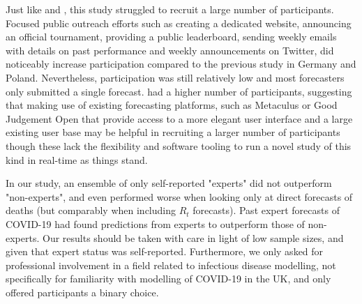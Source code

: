 \documentclass[10pt,a4paper,twocolumn]{article}
\begin{document}

Just like \citet{bosseComparingHumanModelbased2022} and \citet{farrowHumanJudgmentApproach2017}, this study struggled to recruit a large number of participants. Focused public outreach efforts such as creating a dedicated website, announcing an official tournament, providing a public leaderboard, sending weekly emails with details on past performance and weekly announcements on Twitter, did noticeably increase participation compared to the previous study in Germany and Poland. Nevertheless, participation was still relatively low and most forecasters only submitted a single forecast. \citet{mcandrewChimericForecastingCombining2022} had a higher number of participants, suggesting that making use of existing forecasting platforms, such as Metaculus or Good Judgement Open that provide access to a more elegant user interface and a large existing user base may be helpful in recruiting a larger number of participants though these lack the flexibility and software tooling to run a novel study of this kind in real-time as things stand.


In our study, an ensemble of only self-reported "experts" did not outperform "non-experts", and even performed worse when looking only at direct forecasts of deaths (but comparably when including $R_t$ forecasts). Past expert forecasts of COVID-19 \cite{recchiaHowWellDid2021} had found predictions from experts to outperform those of non-experts. Our results should be taken with care in light of low sample sizes, and given that expert status was self-reported. Furthermore, we only asked for professional involvement in a field related to infectious disease modelling, not specifically for familiarity with modelling of COVID-19 in the UK, and only offered participants a binary choice. 

\end{document}
